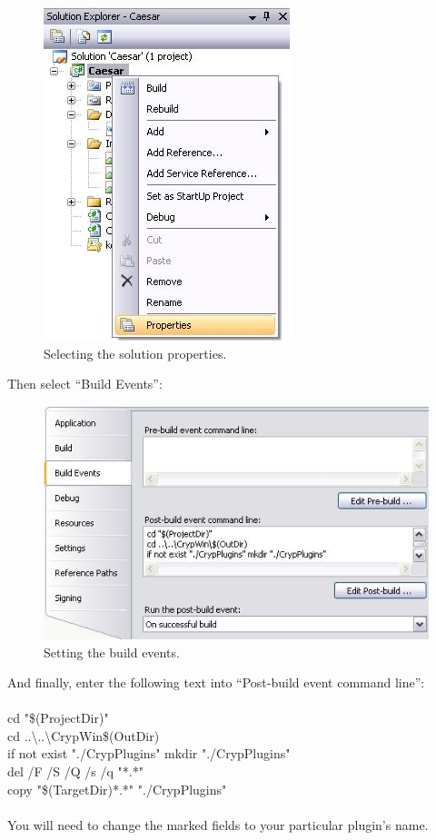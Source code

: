 \begin{figure}[h]
	\centering
		\includegraphics{figures/solution_properties.JPG}
	\caption{Selecting the solution properties.}
	\label{fig:solution_properties}
\end{figure}
\clearpage

\noindent Then select ``Build Events'':

\begin{figure}[h]
	\centering
		\includegraphics{figures/post_build.JPG}
	\caption{Setting the build events.}
	\label{fig:post_build}
\end{figure}

\noindent And finally, enter the following text into ``Post-build event command line'':\\\\
cd "\$(ProjectDir)" \\
cd ..\textbackslash ..\textbackslash CrypWin\$(OutDir)\\
if not exist "./CrypPlugins" mkdir "./CrypPlugins"\\
del /F /S /Q /s /q "*.*"\\
copy "\$(TargetDir)*.*" "./CrypPlugins"\\\\
You will need to change the marked fields to your particular plugin's name.

